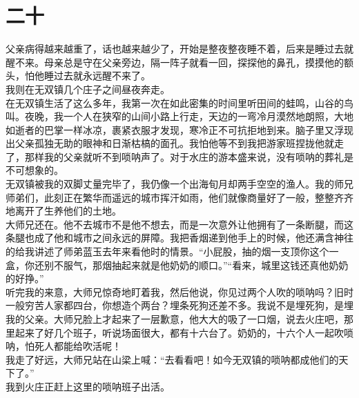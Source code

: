 \fancyhead[RO]{\thepage} %
\fancyhead[LE]{\thepage} %
\fancyfoot[LE,RO]{}
\fancyfoot[LO,CE]{}
\fancyfoot[CO,RE]{}
\chapter*{二十}
父亲病得越来越重了，话也越来越少了，开始是整夜整夜睡不着，后来是睡过去就醒不来。母亲总是守在父亲旁边，隔一阵子就看一回，探探他的鼻孔，摸摸他的额头，怕他睡过去就永远醒不来了。\\

我则在无双镇几个庄子之间昼夜奔走。\\

在无双镇生活了这么多年，我第一次在如此密集的时间里听田间的蛙鸣，山谷的鸟叫。夜晚，我一个人在狭窄的山间小路上行走，天边的一弯冷月漠然地朗照，大地如逝者的巴掌一样冰凉，裹紧衣服才发现，寒冷正不可抗拒地到来。脑子里又浮现出父亲孤独无助的眼神和日渐枯槁的面孔。我怕他等不到我把游家班捏拢他就走了，那样我的父亲就听不到唢呐声了。对于水庄的游本盛来说，没有唢呐的葬礼是不可想象的。\\

无双镇被我的双脚丈量完毕了，我仍像一个出海旬月却两手空空的渔人。我的师兄师弟们，此刻正在繁华而遥远的城市挥汗如雨，他们就像商量好了一般，整整齐齐地离开了生养他们的土地。\\

大师兄还在。他不去城市不是他不想去，而是一次意外让他拥有了一条断腿，而这条腿也成了他和城市之间永远的屏障。我把香烟递到他手上的时候，他还满含神往的给我讲述了师弟蓝玉去年来看他时的情景。“小屁股，抽的烟一支顶你这个一盒，你还别不服气，那烟抽起来就是他奶奶的顺口。”“看来，城里这钱还真他奶奶的好挣。”\\

听完我的来意，大师兄惊奇地盯着我，然后他说，你见过两个人吹的唢呐吗？旧时一般穷苦人家都四台，你想造个两台？埋条死狗还差不多。我说不是埋死狗，是埋我的父亲。大师兄脸上才起来了一层歉意，他大大的吸了一口烟，说去火庄吧，那里起来了好几个班子，听说场面很大，都有十六台了。奶奶的，十六个人一起吹唢呐，怕死人都能给吹活呢！\\

我走了好远，大师兄站在山梁上喊：“去看看吧！如今无双镇的唢呐都成他们的天下了。”\\

我到火庄正赶上这里的唢呐班子出活。\\

